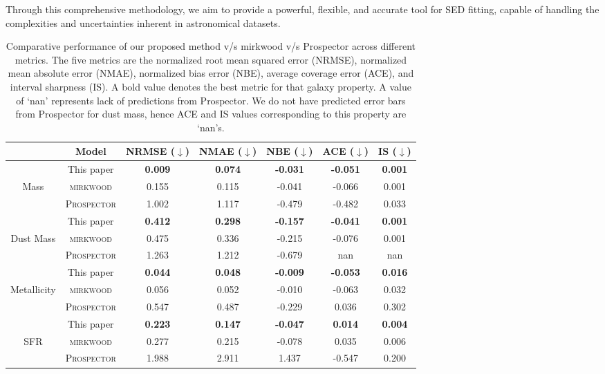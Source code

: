 \documentclass[letterpaper]{article} %
\begin{document}
Through this comprehensive methodology, we aim to provide a powerful, flexible, and accurate tool for SED fitting, capable of handling the complexities and uncertainties inherent in astronomical datasets.
\begin{table*}
\centering
\begin{tabular}{ccccccc}
\toprule
\toprule
& Model &  NRMSE ($\downarrow$) & NMAE ($\downarrow$) & NBE ($\downarrow$) & ACE ($\downarrow$) & IS ($\downarrow$) \\ \midrule
& This paper  &  \textbf{0.009}&  \textbf{0.074}&  \textbf{-0.031}&  \textbf{-0.051}&  \textbf{0.001}\\
Mass & \textsc{mirkwood} &    0.155&  0.115&  -0.041&  -0.066&  0.001 \\
& \textsc{Prospector} &  1.002&  1.117&  -0.479&   -0.482&  0.033\\ \midrule
& This paper  &    \textbf{0.412}&   \textbf{0.298}&  \textbf{-0.157}&   \textbf{-0.041}&  \textbf{0.001}\\
Dust Mass & \textsc{mirkwood} &  0.475&  0.336&  -0.215&  -0.076& 0.001 \\
& \textsc{Prospector} &  1.263&  1.212& -0.679&  nan&  nan \\ \midrule
& This paper&  \textbf{0.044}&   \textbf{0.048}&  \textbf{-0.009}&  \textbf{-0.053}&  \textbf{0.016}\\
Metallicity & \textsc{mirkwood} &  0.056&  0.052&   -0.010&  -0.063&  0.032\\
& \textsc{Prospector}&  0.547&  0.487&   -0.229&  0.036&  0.302\\ \midrule
& This paper&  \textbf{0.223}&   \textbf{0.147}&  \textbf{-0.047}&  \textbf{0.014}&  \textbf{0.004}\\
SFR & \textsc{mirkwood}&   0.277&  0.215&   -0.078&  0.035&  0.006\\
& \textsc{Prospector}&  1.988&  2.911&   1.437&  -0.547&    0.200\\ \bottomrule
\end{tabular}
\caption{Comparative performance of our proposed method v/s {\sc mirkwood} v/s {\sc Prospector} across different metrics. The five metrics are the normalized root mean squared error (NRMSE), normalized mean absolute error (NMAE), normalized bias error (NBE), average coverage error (ACE), and interval sharpness (IS). A bold value denotes the best metric for that galaxy property. A value of `nan' represents lack of predictions from {\sc Prospector}. We do not have predicted error bars from {\sc Prospector} for dust mass, hence ACE and IS values corresponding to this property are `nan's.}
\label{tab:results_snr20}
\end{table*}
\end{document}
